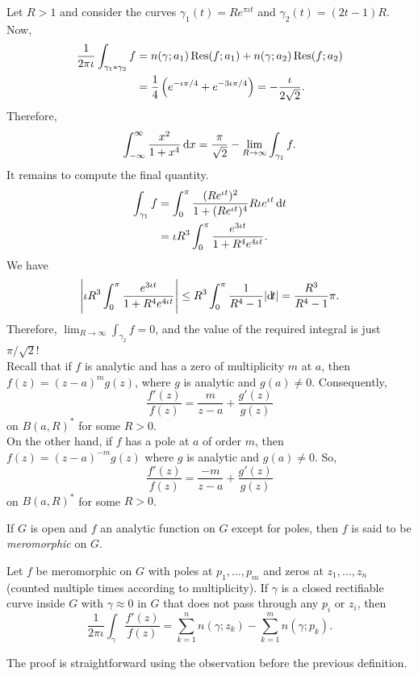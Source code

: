 	Let $R > 1$ and consider the curves $\gamma_1(t) = Re^{\pi\iota t}$ and $\gamma_2(t) = (2t-1)R$. Now,
	\begin{align*}
		\frac{1}{2\pi\iota} \int_{\gamma_1 * \gamma_2} f &= n(\gamma;a_1) \operatorname{Res}(f;a_1) + n(\gamma;a_2) \operatorname{Res}(f;a_2) \\
			&= \frac{1}{4} \left(e^{-\iota\pi/4} + e^{-3\iota\pi/4}\right) = -\frac{\iota}{2\sqrt{2}}.
	\end{align*}
	Therefore,
	\[ \int_{-\infty}^\infty \frac{x^2}{1+x^4} \dif x = \frac{\pi}{\sqrt{2}} - \lim_{R \to \infty} \int_{\gamma_1} f. \]
	It remains to compute the final quantity.
	\begin{align*}
		\int_{\gamma_1} f &= \int_0^\pi \frac{(Re^{\iota t})^2}{1 + (Re^{\iota t})^4} R\iota e^{\iota t} \dif t \\
			&= \iota R^3 \int_0^\pi \frac{e^{3\iota t}}{1 + R^4 e^{4\iota t}}.
	\end{align*}
	We have
	\[ \left| \iota R^3 \int_0^\pi \frac{e^{3\iota t}}{1 + R^4 e^{4\iota t}} \right| \le R^3 \int_0^\pi \frac{1}{R^4 - 1} |{\dif}{t}| = \frac{R^3}{R^4 - 1} \pi. \]
	Therefore, $\lim_{R\to\infty} \int_{\gamma_2} f = 0$, and the value of the required integral is just $\pi/\sqrt{2}$!\\

	Recall that if $f$ is analytic and has a zero of multiplicity $m$ at $a$, then
	$f(z) = (z-a)^m g(z)$, where $g$ is analytic and $g(a) \ne 0$. Consequently,
	\[ \frac{f'(z)}{f(z)} = \frac{m}{z-a} + \frac{g'(z)}{g(z)} \]
	on $B(a,R)^*$ for some $R > 0$.\\
	On the other hand, if $f$ has a pole at $a$ of order $m$, then $f(z) = (z-a)^{-m} g(z)$ where $g$ is analytic and $g(a) \ne 0$. So,
	\[ \frac{f'(z)}{f(z)} = \frac{-m}{z-a} + \frac{g'(z)}{g(z)} \]
	on $B(a,R)^*$ for some $R > 0$.\\

	\begin{fdef}
		If $G$ is open and $f$ an analytic function on $G$ except for poles, then $f$ is said to be \emph{meromorphic} on $G$.
	\end{fdef}

	\begin{ftheo}
		\label{argument principle}
		Let $f$ be meromorphic on $G$ with poles at $p_1,\ldots,p_m$ and zeros at $z_1,\ldots,z_n$ (counted multiple times according to multiplicity). If $\gamma$ is a closed rectifiable curve inside $G$ with $\gamma \approx 0$ in $G$ that does not pass through any $p_i$ or $z_i$, then
		\[ \frac{1}{2\pi\iota} \int_{\gamma} \frac{f'(z)}{f(z)} = \sum_{k=1}^n n(\gamma;z_k) - \sum_{k=1}^m n(\gamma;p_k). \]
	\end{ftheo}
	The proof is straightforward using the observation before the previous definition.\\


